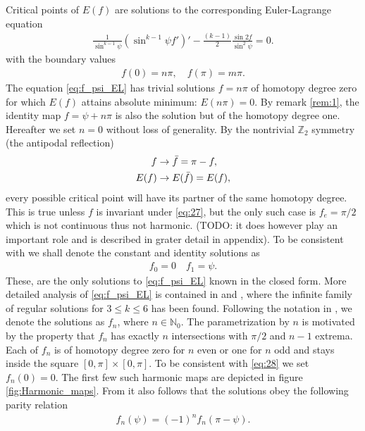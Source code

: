 Critical points of $E(f)$ are solutions to the corresponding
Euler-Lagrange equation
\begin{align}
  \label{eq:f_psi_EL} \frac{1}{\sin^{k-1}\psi}\left(\sin^{k-1}\psi
    f'\right)'-\frac{(k-1)}{2}\frac{\sin2f}{\sin^2\psi}=0.
\end{align} with the boundary values
\begin{align}
  \label{eq:25} f(0)=n\pi,\quad f(\pi)=m\pi.
\end{align} The equation \eqref{eq:f_psi_EL} has trivial solutions
$f=n\pi$ of homotopy degree zero for which $E(f)$ attains absolute
minimum: $E(n\pi)=0$. By remark \ref{rem:1}, the identity map
$f=\psi+n\pi$ is also the solution but of the homotopy degree one.
Hereafter we set $n=0$ without loss of generality.
By the nontrivial $\mathbb{Z}_2$ symmetry (the antipodal
reflection)
\begin{align}
  \label{eq:27}
  f&\rightarrow \bar{f}=\pi-f,\\
  E(f)&\rightarrow E(\bar{f})=E(f),
\end{align}
every possible critical point will have its partner of the same
homotopy degree. This is true unless $f$ is invariant under
\eqref{eq:27}, but the only such case is $f_e=\pi/2$ which is not
continuous thus not harmonic. (TODO: it does however play an important
role and is described in grater detail in appendix). To be consistent
with \cite{Bizon1997} we shall denote the constant and identity
solutions as
\begin{align}
  \label{eq:28}
  f_0=0\quad f_1=\psi.
\end{align}
These, are the only solutions to \eqref{eq:f_psi_EL} known in the
closed form. More detailed analysis of \eqref{eq:f_psi_EL} is
contained in \cite{Bizon1997} and \cite{Corlette2001}, where the
infinite family of regular solutions for $3\le k\le6$ has been
found. Following the notation in \cite{Bizon1997}, we denote the
solutions as $f_n$, where $n\in\mathbb{N}_0$. The parametrization by
$n$ is motivated by the property that $f_n$ has exactly $n$
intersections with $\pi/2$ and $n-1$ extrema. Each of $f_n$ is of
homotopy degree zero for $n$ even or one for $n$ odd and stays inside
the square $[0,\pi]\times[0,\pi]$. To be consistent with \eqref{eq:28}
we set $f_n(0)=0$. The first few such harmonic maps are depicted in
figure \ref{fig:Harmonic_maps}. From \cite{Bizon1997} it also follows
that the solutions obey the following parity relation
\begin{align}
  \label{eq:29}
  f_n(\psi)=(-1)^n f_n(\pi-\psi).
\end{align}

